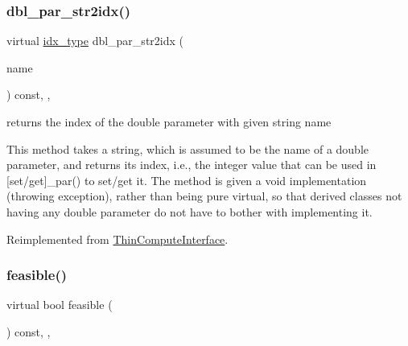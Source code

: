 \subsubsection{\texorpdfstring{dbl\+\_\+par\+\_\+str2idx()}{dbl\_par\_str2idx()}}
{\footnotesize\ttfamily virtual \mbox{\hyperlink{class_s_m_spp__di__unipi__it_1_1_thin_compute_interface_aa3d710629ad8c434286726ad810c3b47}{idx\+\_\+type}} dbl\+\_\+par\+\_\+str2idx (\begin{DoxyParamCaption}\item[{const std\+::string \&}]{name }\end{DoxyParamCaption}) const\hspace{0.3cm}{\ttfamily [inline]}, {\ttfamily [override]}, {\ttfamily [virtual]}}



returns the index of the double parameter with given string name 

This method takes a string, which is assumed to be the name of a double parameter, and returns its index, i.\+e., the integer value that can be used in \mbox{[}set/get\mbox{]}\+\_\+par() to set/get it. The method is given a void implementation (throwing exception), rather than being pure virtual, so that derived classes not having any double parameter do not have to bother with implementing it. 

Reimplemented from \mbox{\hyperlink{class_s_m_spp__di__unipi__it_1_1_thin_compute_interface_a82f363814aa27e3243ba994a1ed5f39e}{Thin\+Compute\+Interface}}.

\mbox{\label{class_s_m_spp__di__unipi__it_1_1_f_row_constraint_a508a569b1ce65668a4bbe261b0e2efab}} 
\subsubsection{\texorpdfstring{feasible()}{feasible()}}
{\footnotesize\ttfamily virtual bool feasible (\begin{DoxyParamCaption}\item[{void}]{ }\end{DoxyParamCaption}) const\hspace{0.3cm}{\ttfamily [inline]}, {\ttfamily [override]}, {\ttfamily [virtual]}}



